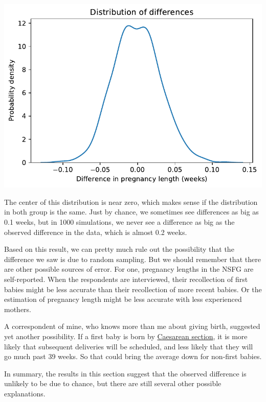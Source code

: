 \begin{center}
\includegraphics[scale=0.75]{13_hypothesis_files/13_hypothesis_66_0.pdf}
\end{center}

The center of this distribution is near zero, which makes sense if the
distribution in both group is the same. Just by chance, we sometimes see
differences as big as 0.1 weeks, but in 1000 simulations, we never see a
difference as big as the observed difference in the data, which is
almost 0.2 weeks.

Based on this result, we can pretty much rule out the possibility that
the difference we saw is due to random sampling. But we should remember
that there are other possible sources of error. For one, pregnancy
lengths in the NSFG are self-reported. When the respondents are
interviewed, their recollection of first babies might be less accurate
than their recollection of more recent babies. Or the estimation of
pregnancy length might be less accurate with less experienced mothers.

A correspondent of mine, who knows more than me about giving birth,
suggested yet another possibility. If a first baby is born by
\href{https://en.wikipedia.org/wiki/Caesarean_section}{Caesarean
section}, it is more likely that subsequent deliveries will be
scheduled, and less likely that they will go much past 39 weeks. So that
could bring the average down for non-first babies.

In summary, the results in this section suggest that the observed
difference is unlikely to be due to chance, but there are still several
other possible explanations.

